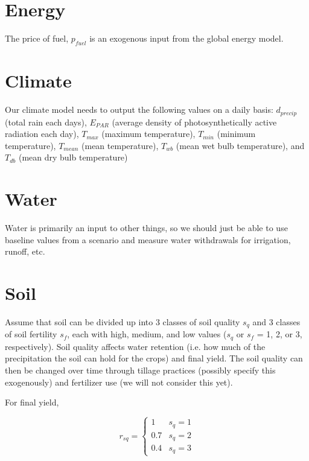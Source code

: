 \documentclass[letter,12pt]{article}
\begin{document}
\pagebreak



\section{Energy}

The price of fuel, $p_{fuel}$ is an exogenous input from the global energy model.

\section{Climate}

Our climate model needs to output the following values on a daily basis: $d_{precip}$ (total rain each days), $E_{PAR}$ (average density of photosynthetically active radiation each day), $T_{max}$ (maximum temperature), $T_{min}$ (minimum temperature), $T_{mean}$ (mean temperature), $T_{wb}$ (mean wet bulb temperature), and $T_{db}$ (mean dry bulb temperature)

\section{Water}

Water is primarily an input to other things, so we should just be able to use baseline values from a scenario and measure water withdrawals for irrigation, runoff, etc.


\section{Soil}

Assume that soil can be divided up into 3 classes of soil quality $s_q$ and 3 classes of soil fertility $s_f$, each with high, medium, and low values ($s_q$ or $s_f$ = 1, 2, or 3, respectively).  Soil quality affects water retention (i.e. how much of the precipitation the soil can hold for the crops) and final yield.  The soil quality can then be changed over time through tillage practices (possibly specify this exogenously) and fertilizer use (we will not consider this yet).  

For final yield, 

\begin{equation}
r_{sq} = \left\{ \begin{array}{cc}
1			&s_q = 1 \\
0.7		&s_q = 2 \\
0.4		&s_q = 3
\end{array}
\right.
\end{equation}
\end{document}
